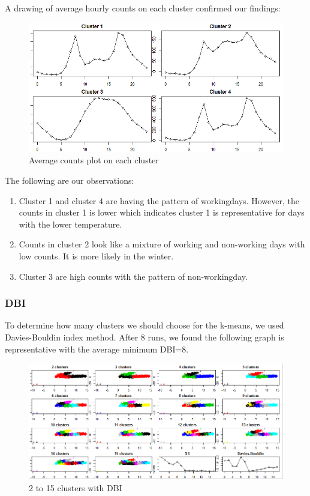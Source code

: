 \documentclass[12pt]{article}
\begin{document}
A drawing of average hourly counts on each cluster confirmed our findings:
	\begin{figure}[H]
		\centering
		\includegraphics[scale=.65]{figures/kmeans_clusters.png}
		\caption{Average counts plot on each cluster}
	\end{figure}
The following are our observations:

\begin{enumerate}
	\item Cluster 1 and cluster 4 are having the pattern of workingdays. However, the counts in cluster 1 is lower which indicates cluster 1 is representative for days with the lower temperature.
	\item Counts in cluster 2 look like a mixture of working and non-working days with low counts. It is more likely in the winter.
	\item Cluster 3 are high counts with the pattern of non-workingday.
\end{enumerate}

\subsubsection{DBI}
To determine how many clusters we should choose for the k-means, we used Davies-Bouldin index method. After 8 runs, we found the following graph is representative with the average minimum DBI=8.
	\begin{figure}[H]
		\includegraphics[scale=.65]{figures/dbi_8.png}
		\caption{2 to 15 clusters with DBI}
	\end{figure}
	
\end{document}
